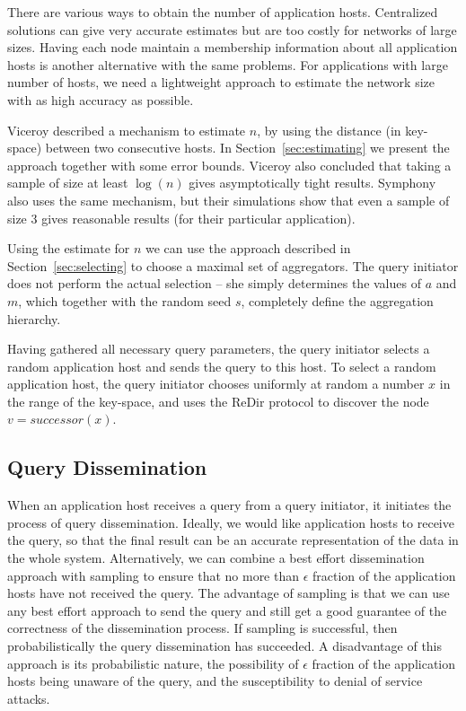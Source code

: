 \documentclass{article}
\begin{document}
There are various ways to obtain the number of application
hosts. Centralized solutions can give very accurate estimates but are
too costly for networks of large sizes. Having each node maintain a
membership information about all application hosts is another
alternative with the same problems. For applications with large number
of hosts, we need a lightweight approach to estimate the network size
with as high accuracy as possible. 

Viceroy described a mechanism to estimate $n$, by using the distance
(in key-space) between two consecutive hosts. In
Section~\ref{sec:estimating} we present the approach together with
some error bounds. Viceroy also concluded that taking a sample of size
at least $\log(n)$ gives asymptotically tight results. Symphony also
uses the same mechanism, but their simulations show that even a sample
of size 3 gives reasonable results (for their particular application).

Using the estimate for $n$ we can use the approach described in
Section~\ref{sec:selecting} to choose a maximal set of
aggregators. The query initiator does not perform the actual selection
-- she simply determines the values of $a$ and $m$, which together
with the random seed $s$, completely define the aggregation hierarchy.

Having gathered all necessary query parameters, the query initiator
selects a random application host and sends the query to this host. To
select a random application host, the query initiator chooses
uniformly at random a number $x$ in the range of the key-space, and uses
the ReDir protocol to discover the node $v=successor(x)$.   

\subsection{Query Dissemination}
When an application host receives a query from a query
initiator, it initiates the process of query dissemination. Ideally,
we would like application hosts to receive the query, so that the
final result can be an accurate representation of the data in the
whole system. Alternatively, we can combine a best effort
dissemination approach with sampling to ensure that no more than
$\epsilon$ fraction of the application hosts have not received the
query. The 
advantage of sampling  is that we can use any best effort
approach to send the query and still get a good guarantee of the
correctness of the dissemination process. If sampling is successful, then
probabilistically the query dissemination has succeeded. A
disadvantage of this approach is its probabilistic nature, the
possibility of $\epsilon$ fraction of the application hosts being
unaware of the query, and the susceptibility to denial of service
attacks.
\end{document}
